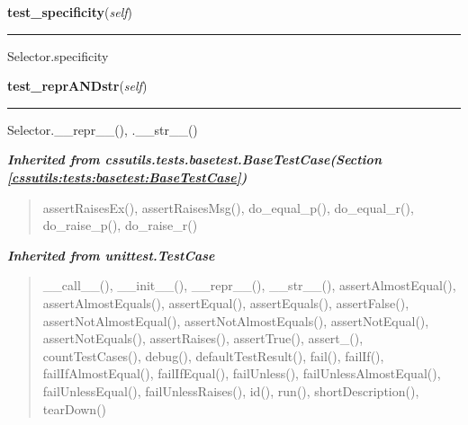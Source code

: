     \vspace{0.5ex}

\hspace{.8\funcindent}\begin{boxedminipage}{\funcwidth}

    \raggedright \textbf{test\_specificity}(\textit{self})

    \vspace{-1.5ex}

    \rule{\textwidth}{0.5\fboxrule}
\setlength{\parskip}{2ex}
    Selector.specificity

\setlength{\parskip}{1ex}
    \end{boxedminipage}

    \label{cssutils:tests:test_selector:SelectorTestCase:test_reprANDstr}

    \vspace{0.5ex}

\hspace{.8\funcindent}\begin{boxedminipage}{\funcwidth}

    \raggedright \textbf{test\_reprANDstr}(\textit{self})

    \vspace{-1.5ex}

    \rule{\textwidth}{0.5\fboxrule}
\setlength{\parskip}{2ex}
    Selector.\_\_repr\_\_(), .\_\_str\_\_()

\setlength{\parskip}{1ex}
    \end{boxedminipage}


\large{\textbf{\textit{Inherited from cssutils.tests.basetest.BaseTestCase\textit{(Section \ref{cssutils:tests:basetest:BaseTestCase})}}}}

\begin{quote}
assertRaisesEx(), assertRaisesMsg(), do\_equal\_p(), do\_equal\_r(), do\_raise\_p(), do\_raise\_r()
\end{quote}

\large{\textbf{\textit{Inherited from unittest.TestCase}}}

\begin{quote}
\_\_call\_\_(), \_\_init\_\_(), \_\_repr\_\_(), \_\_str\_\_(), assertAlmostEqual(), assertAlmostEquals(), assertEqual(), assertEquals(), assertFalse(), assertNotAlmostEqual(), assertNotAlmostEquals(), assertNotEqual(), assertNotEquals(), assertRaises(), assertTrue(), assert\_(), countTestCases(), debug(), defaultTestResult(), fail(), failIf(), failIfAlmostEqual(), failIfEqual(), failUnless(), failUnlessAlmostEqual(), failUnlessEqual(), failUnlessRaises(), id(), run(), shortDescription(), tearDown()
\end{quote}

